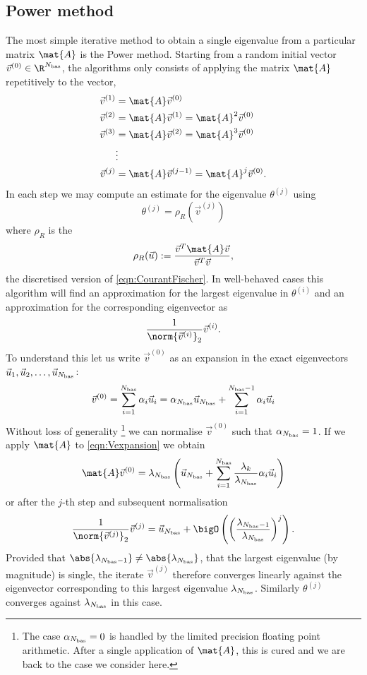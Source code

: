 \subsection{Power method}
The most simple iterative method to obtain
a single eigenvalue from a particular matrix $\mat{A}$ is the Power method.
Starting from a random initial vector $\vec{v}^{(0)} \in \R^{\Nbas}$,
the algorithms only consists of applying the matrix $\mat{A}$
repetitively to the vector, \ie
\begin{align*}
	\vec{v}^{(1)} &= \mat{A} \vec{v}^{(0)} \\
	\vec{v}^{(2)} &= \mat{A} \vec{v}^{(1)} = \mat{A}^2 \vec{v}^{(0)} \\
	\vec{v}^{(3)} &= \mat{A} \vec{v}^{(2)} = \mat{A}^3 \vec{v}^{(0)} \\
	&\vdots \\
	\vec{v}^{(j)} &= \mat{A} \vec{v}^{(j-1)} = \mat{A}^j \vec{v}^{(0)}.
\end{align*}
In each step we may compute an estimate for the eigenvalue $\theta^{(j)}$ using
\[ \theta^{(j)} = \rho_R\left(\vec{v}^{(j)}\right) \]
where $\rho_R$ is the 
\begin{equation}
	 \rho_R(\vec{u}) := \frac{\vec{v}^T \mat{A} \vec{v}}{\vec{v}^T \vec{v}},
	\label{eqn:RayleighQuotient}
\end{equation}
the discretised version of \eqref{eqn:CourantFischer}.
In well-behaved cases this algorithm will find an approximation for
the largest eigenvalue in $\theta^{(i)}$
and an approximation for the corresponding eigenvector as
\[ \frac{1}{\norm{\vec{v}^{(i)}}_2}  \vec{v}^{(i)}. \]
To understand this
let us write $\vec{v}^{(0)}$ as an expansion in the exact
eigenvectors \linebreak $\vec{u}_1, \vec{u}_2, \ldots, \vec{u}_{N_\text{bas}}$:
\begin{equation}
	\vec{v}^{(0)} = \sum_{i=1}^{N_\text{bas}} \alpha_i \vec{u}_i = \alpha_{N_\text{bas}} \vec{u}_{N_\text{bas}} + \sum_{i=1}^{N_\text{bas}-1} \alpha_i \vec{u}_i
	\label{eqn:Vexpansion}
\end{equation}
Without loss of generality%
\footnote{The case $\alpha_{N_\text{bas}} = 0$ is handled by the limited precision
floating point arithmetic. After a single application of $\mat{A}$,
this is cured and we are back to the case we consider here.}
we can normalise $\vec{v}^{(0)}$ such that $\alpha_{N_\text{bas}} = 1$.
If we apply $\mat{A}$ to \eqref{eqn:Vexpansion} we obtain
\[
	\mat{A} \vec{v}^{(0)} = \lambda_{\Nbas} \left( \vec{u}_{\Nbas} + \sum_{i=1}^{\Nbas}
	\frac{\lambda_k}{\lambda_{\Nbas}}
	\alpha_i \vec{u}_i \right)
\]
or after the $j$-th step and subsequent normalisation
\[
	\frac{1}{\norm{\vec{v}^{(j)}}_2} \vec{v}^{(j)} =
	\vec{u}_{\Nbas} + \bigO\left(
	\left( \frac{\lambda_{\Nbas-1}}{\lambda_{\Nbas}} \right)^j
	\right).
\]
Provided that $\abs{\lambda_{\Nbas-1}} \neq \abs{\lambda_{\Nbas}}$,
\ie that the largest eigenvalue (by magnitude) is single,
the iterate $\vec{v}^{(j)}$
therefore converges linearly against the eigenvector corresponding to this
largest eigenvalue $\lambda_{N_\text{bas}}$.
Similarly $\theta^{(j)}$ converges against $\lambda_{N_\text{bas}}$ in this case.


